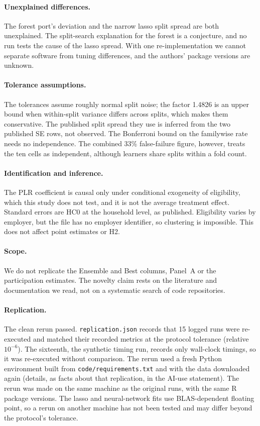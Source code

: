 \documentclass[11pt]{article}
\begin{document}
\paragraph{Unexplained differences.} The forest port's deviation and the narrow lasso
split spread are both unexplained. The split-search explanation for the forest is a
conjecture, and no run tests the cause of the lasso spread. With one re-implementation
we cannot separate software from tuning differences, and the authors' package versions
are unknown.

\paragraph{Tolerance assumptions.} The tolerances assume roughly normal split noise; the
factor 1.4826 is an upper bound when within-split variance differs across splits, which
makes them conservative. The published split spread they use is inferred from the two
published SE rows, not observed. The Bonferroni bound on the familywise rate needs no
independence. The combined 33\% false-failure figure, however, treats the ten cells as
independent, although learners share splits within a fold count.

\paragraph{Identification and inference.} The PLR coefficient is causal only under
conditional exogeneity of eligibility, which this study does not test, and it is not the
average treatment effect. Standard errors are HC0 at the household level, as published.
Eligibility varies by employer, but the file has no employer identifier, so clustering is
impossible. This does not affect point estimates or H2.

\paragraph{Scope.} We do not replicate the Ensemble and Best columns, Panel~A or the
participation estimates. The novelty claim rests on the literature and documentation we
read, not on a systematic search of code repositories.

\paragraph{Replication.} The clean rerun passed. \texttt{replication.json} records that
15 logged runs were re-executed and matched their recorded metrics at the protocol
tolerance (relative $10^{-6}$). The sixteenth, the synthetic timing run, records only
wall-clock timings, so it was re-executed without comparison. The rerun used a fresh Python
environment built from \texttt{code/requirements.txt} and with the data downloaded again
(details, as facts about that replication, in the AI-use statement). The rerun was made
on the same machine as the original runs, with the same R package versions. The lasso and
neural-network fits use BLAS-dependent floating point, so a rerun on another machine has
not been tested and may differ beyond the protocol's tolerance.
\end{document}
